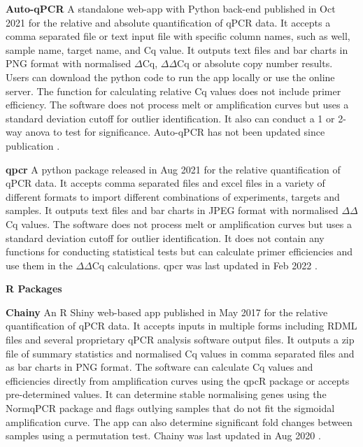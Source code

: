 \documentclass[../main.tex]{subfiles}
\begin{document}
\textbf{Auto-qPCR} A standalone web-app with Python back-end published in Oct 2021 for the relative and absolute quantification of qPCR data. 
It accepts a comma separated file or text input file with specific column names, such as well, sample name, target name, and Cq value. 
It outputs text files and bar charts in PNG format with normalised $\Delta$Cq, $\Delta\Delta$Cq or absolute copy number results. 
Users can download the python code to run the app locally or use the online server. 
The function for calculating relative Cq values does not include primer efficiency. 
The software does not process melt or amplification curves but uses a standard deviation cutoff for outlier identification. 
It also can conduct a 1 or 2-way anova to test for significance. Auto-qPCR has not been updated since publication \parencite{Maussion2021}.

\textbf{qpcr}
A python package released in Aug 2021 for the relative quantification of qPCR data. 
It accepts comma separated files and excel files in a variety of different formats to import different combinations of experiments, targets and samples. 
It outputs text files and bar charts in JPEG format with normalised $\Delta\Delta$Cq values. The software does not process melt or amplification curves but uses a standard deviation cutoff for outlier identification. 
It does not contain any functions for conducting statistical tests but can calculate primer efficiencies and use them in the $\Delta\Delta$Cq calculations. 
qpcr was last updated in Feb 2022 \parencite{Kleinschmidt2022}.

\textbf{R Packages}

\textbf{Chainy} An R Shiny web-based app published in May 2017 for the relative quantification of qPCR data. 
It accepts inputs in multiple forms including RDML files and several proprietary qPCR analysis software output files. 
It outputs a zip file of summary statistics and normalised Cq values in comma separated files and as bar charts in PNG format. 
The software can calculate Cq values and efficiencies directly from amplification curves using the qpcR package or accepts pre-determined values. 
It can determine stable normalising genes using the NormqPCR package and flags outlying samples that do not fit the sigmoidal amplification curve. 
The app can also determine significant fold changes between samples using a permutation test. 
Chainy was last updated in Aug 2020 \parencite{Mallona2017}.
\end{document}
